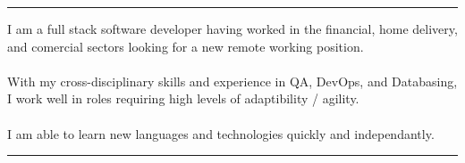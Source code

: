 \documentclass[12pt]{developercv} %
\begin{document}


\vspace{+\baselineskip}
\hrule
\vspace{+\baselineskip}

\begin{minipage}[t]{\textwidth}
{
I am a full stack software developer having worked in the financial, home delivery, and comercial sectors looking for a new remote working position.
}
\\\\
{
With my cross-disciplinary skills and experience in QA, DevOps, and Databasing, I work well in roles requiring high levels of adaptibility / agility.
}	
\\\\
{
I am able to learn new languages and technologies quickly and independantly.
}

\end{minipage}


\vspace{\baselineskip}
\hrule
\vspace{\baselineskip}






\end{document}
